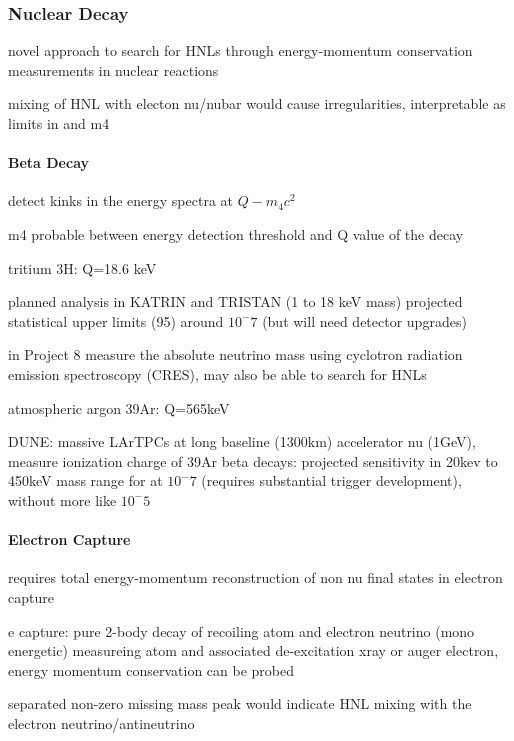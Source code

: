 

\subsubsection{Nuclear Decay}

novel approach to search for HNLs through energy-momentum conservation measurements in nuclear reactions

mixing of HNL with electon nu/nubar would cause irregularities, interpretable as limits in  and m4


\paragraph{Beta Decay}

detect kinks in the energy spectra at $Q-m_4c^2$

m4 probable between energy detection threshold and Q value of the decay

tritium 3H: Q=18.6 keV

planned analysis in KATRIN and TRISTAN (1 to 18 keV mass) projected statistical upper limits (95) around $10^-7$  (but will need detector upgrades)

in Project 8 measure the absolute neutrino mass using cyclotron radiation emission spectroscopy (CRES), may also be able to search for HNLs


atmospheric argon 39Ar: Q=565keV

DUNE: massive LArTPCs at long baseline (1300km) accelerator nu (1GeV), measure ionization charge of 39Ar beta decays: projected sensitivity in 20kev to 450keV mass range for  at $10^-7$ (requires substantial trigger development), without more like $10^-5$


\paragraph{Electron Capture}

requires total energy-momentum reconstruction of non nu final states in electron capture

e capture: pure 2-body decay of recoiling atom and electron neutrino (mono energetic)
measureing atom and associated de-excitation xray or auger electron, energy momentum conservation can be probed

separated non-zero missing mass peak would indicate HNL mixing with the electron neutrino/antineutrino

